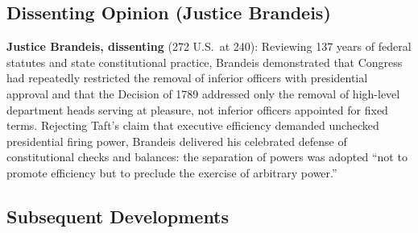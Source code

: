 \documentclass[12pt]{article}
\begin{document}
\subsection{Dissenting Opinion (Justice Brandeis)}

\textbf{Justice Brandeis, dissenting} (272 U.S.\ at 240): Reviewing 137 years of federal statutes and state constitutional practice, Brandeis demonstrated that Congress had repeatedly restricted the removal of inferior officers with presidential approval and that the Decision of 1789 addressed only the removal of high-level department heads serving at pleasure, not inferior officers appointed for fixed terms. Rejecting Taft's claim that executive efficiency demanded unchecked presidential firing power, Brandeis delivered his celebrated defense of constitutional checks and balances: the separation of powers was adopted ``not to promote efficiency but to preclude the exercise of arbitrary power.''

\subsection{Subsequent Developments}
\end{document}
